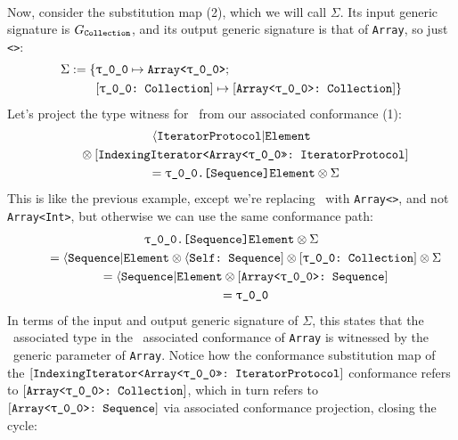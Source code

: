 \documentclass[../generics]{subfiles}
\begin{document}
\begin{example}
\begin{gather*}
\end{gather*}
Now, consider the substitution map (2), which we will call $\Sigma$. Its input generic signature is $G_{\texttt{Collection}}$, and its output generic signature is that of \texttt{Array}, so just \texttt{<\rT>}:
\begin{align*}
\Sigma := \SubstMapC{&\SubstType{\rT}{Array<\rT>}}{\\
&\SubstConf{\rT}{Array<\rT>}{Collection}}
\end{align*}
Let's project the type witness for \nElement\ from our associated conformance (1):
\begin{gather*}
\AIElement \\
\qquad {} \otimes \ConfReq{IndexingIterator<Array<\rT>>}{IteratorProtocol} \\
\qquad {} = \texttt{\rT.[Sequence]Element} \otimes \Sigma
\end{gather*}
This is like the previous example, except we're replacing \rT\ with \texttt{Array<\rT>}, and not \texttt{Array<Int>}, but otherwise we can use the same conformance path:
\begin{gather*}
\texttt{\rT.[Sequence]Element} \otimes \Sigma \\
\qquad {} = \AElement \otimes \SelfSequence \otimes \rTCollection \otimes \Sigma \\
\qquad {} = \AElement \otimes \ArraySequence \\
\qquad {} = \rT
\end{gather*}
In terms of the input and output generic signature of $\Sigma$, this states that the \nElement\ associated type in the \nIterator\ associated conformance of \texttt{Array} is witnessed by the \nElement\ generic parameter of \texttt{Array}. Notice how the conformance substitution map of the $\ConfReq{IndexingIterator<Array<\rT>>}{IteratorProtocol}$ conformance refers to $\ArrayCollection$, which in turn refers to $\ArraySequence$ via associated conformance projection, closing the cycle:
\end{example}

\medskip
\end{document}
